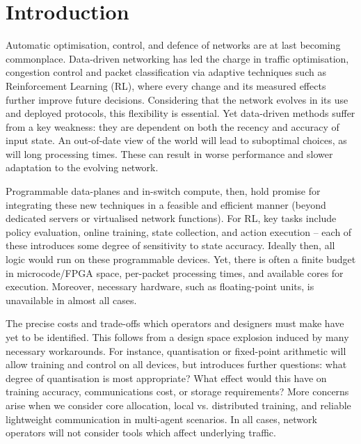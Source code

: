 \documentclass[sigconf,natbib=false]{acmart}
\begin{document}
\section{Introduction}

Automatic optimisation, control, and defence of networks are at last becoming commonplace. Data-driven networking has led the charge in traffic optimisation, congestion control and packet classification via adaptive techniques such as Reinforcement Learning (RL), where every change and its measured effects further improve future decisions. Considering that the network evolves in its use and deployed protocols, this flexibility is essential. Yet data-driven methods suffer from a key weakness: they are dependent on both the recency and accuracy of input state. An out-of-date view of the world will lead to suboptimal choices, as will long processing times. These can result in worse performance and slower adaptation to the evolving network.

Programmable data-planes and in-switch compute, then, hold promise for integrating these new techniques in a feasible and efficient manner (beyond dedicated servers or virtualised network functions). For RL, key tasks include policy evaluation, online training, state collection, and action execution -- each of these introduces some degree of sensitivity to state accuracy. Ideally then, all logic would run on these programmable devices. Yet, there is often a finite budget in microcode/FPGA space, per-packet processing times, and available cores for execution. Moreover, necessary hardware, such as floating-point units, is unavailable in almost all cases.

The precise costs and trade-offs which operators and designers must make have yet to be identified. This follows from a design space explosion induced by many necessary workarounds. For instance, quantisation or fixed-point arithmetic will allow training and control on all devices, but introduces further questions: what degree of quantisation is most appropriate? What effect would this have on training accuracy, communications cost, or storage requirements? More concerns arise when we consider core allocation, local vs. distributed training, and reliable lightweight communication in multi-agent scenarios. In all cases, network operators will not consider tools which affect underlying traffic.
\end{document}
